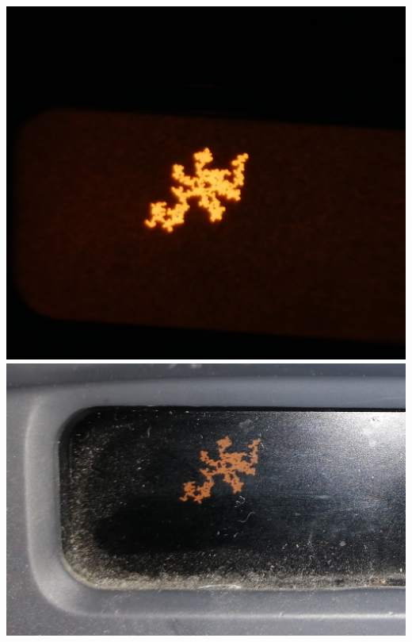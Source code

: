 \documentclass[12pt,a4paper]{scrartcl}
\numberwithin{equation}{subsection}
\newcommand{\1}{\mathbbm{1}}
\numberwithin{equation}{section}
\theoremstyle{definition}
\begin{document}
\includegraphics[scale=0.04]{display.jpg} 
\includegraphics[scale=0.091]{display2.jpg} 

\newpage
\end{document}
